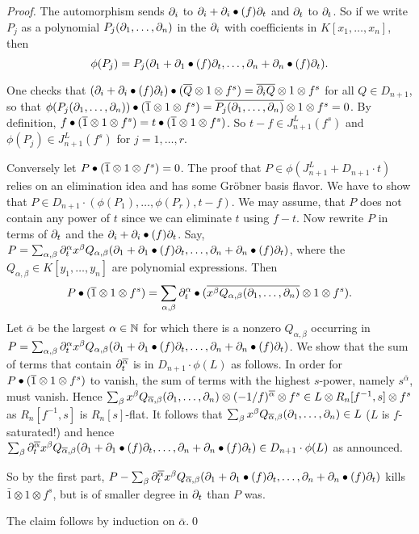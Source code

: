 \begin{proof}
The automorphism sends $\partial_i$ to $\partial_i+\partial_i\bullet(f)\partial_t$ 
and $\partial_t$ to
$\partial_t$. So if we write $P_j$ as a polynomial
$P_j(\partial_1,\ldots,\partial_n)$
in the $\partial_i$ 
with coefficients in
$K[x_1,\ldots,x_n]$, then 
\[
\phi
(P_j)=P_j(\partial_1+\partial_1\bullet(f)\partial_t,\ldots,\partial_n+\partial_n\bullet(f)\partial_t).
\]

One checks that $(\partial_i+\partial_i\bullet(f)\partial_t)\bullet 
(\overline{Q}\otimes 1\otimes f^s)=
\overline{\partial_i
Q}\otimes 1\otimes f^s$ for all $Q\in D_{n+1}$, so that
$\phi(P_j(\partial_1,\ldots,\partial_n))\bullet (
\overline{1}\otimes 1\otimes f^s)=\overline{P_j(\partial_1,\ldots,\partial_n)}\otimes 1
\otimes f^s=0$. By
definition, $f\bullet
(\overline{1}\otimes 1\otimes f^s)=t\bullet (\overline{1}\otimes 1\otimes f^s)$. So $t-f\in
J^L_{n+1}(f^s)$ and $\phi(P_j)\in J^L_{n+1}(f^s)$ for $j=1,\ldots,r$.

Conversely let $P\bullet (\overline{1}\otimes 1\otimes f^s)=0$. The proof that
$P\in\phi(J^L_{n+1}+D_{n+1}\cdot t)$ relies on
an elimination idea and has some Gr\"obner basis flavor. 
We have to show that
$P\in D_{n+1}\cdot (\phi(P_1),\ldots,\phi(P_r),t-f)$. 
We may assume, that $P$ does
not contain 
any power of  $t$ since we can eliminate $t$ using $f-t$. Now rewrite $P$ in
terms of $\partial_t$ and the $\partial_i+\partial_i\bullet(f)\partial_t$. Say, 
$P=\sum_{\alpha,\beta}
\partial_t^\alpha
x^\beta
Q_{\alpha,\beta}
(\partial_1+\partial_1\bullet(f)\partial_t,\ldots,\partial_n+\partial_n\bullet(f)\partial_t)$, 
where the $Q_{\alpha,\beta}\in K[y_1,\ldots,y_n]$ are polynomial
expressions. 
Then
\[
P\bullet (\overline{1}\otimes 1\otimes f^s)=\sum_{\alpha,\beta} 
\partial_t^\alpha\bullet(
\overline{x^\beta
Q_{\alpha,\beta}(\partial_1,\ldots,\partial_n)}\otimes 1\otimes f^s).
\] 
Let $\bar\alpha$ be the largest $\alpha\in{\mathbb N}$ for which there is a
nonzero $Q_{\alpha,\beta}$ occurring in $P=\sum_{\alpha,\beta}
\partial_t^\alpha
x^\beta Q_{\alpha,\beta}(\partial_1+\partial_1\bullet(f)\partial_t,\ldots,\partial_n+\partial_n\bullet(f)\partial_t)$.
We show that the sum of terms that contain
$\partial_t^{\overline{\alpha}}$ is in $D_{n+1}\cdot \phi(L)$ as
follows. In 
order for $P\bullet 
(\overline{1}\otimes 1\otimes f^s)$ to vanish, the sum of terms with the
highest $s$-power, namely $s^{\bar\alpha}$, must vanish. Hence  
$\sum_\beta 
x^\beta Q_{\overline{\alpha},\beta}(\partial_1,\ldots,\partial_n)
\otimes (-1/f)^{\overline{\alpha}}\otimes f^s
\in
L\otimes R_n[f^{-1},s]\otimes f^s$ as $R_n[f^{-1},s]$ is $R_n[s]$-flat.
It follows that $\sum_\beta x^\beta
Q_{\overline{\alpha},\beta}(\partial_1,\ldots,\partial_n)\in L$ ($L$ is
$f$-saturated!) and hence $\sum_\beta
\partial_t^{\overline{\alpha}}
x^\beta
Q_{\overline{\alpha},\beta}
(\partial_1+\partial_1\bullet(f)\partial_t,\ldots,\partial_n+\partial_n\bullet(f)  
\partial_t)\in
D_{n+1}\cdot \phi(L)$ as announced.

So by the first part,
$P-\sum_\beta \partial_t^{\overline{\alpha}} x^\beta
Q_{\overline{\alpha},\beta}(\partial_1+\partial_1\bullet(f)\partial_t,\ldots,\partial_n+\partial_n
\bullet(f)\partial_t)$ kills
$\bar 1\otimes 1\otimes f^s$, but is of 
smaller degree in $\partial_t$ than $P$ was.

The claim follows by induction on $\bar\alpha$.\qed
\end{proof}

